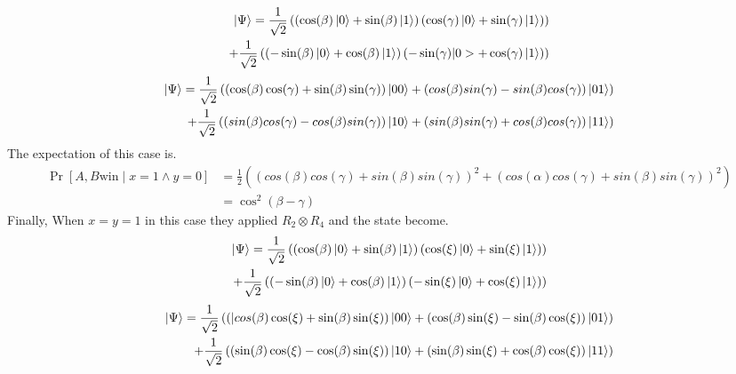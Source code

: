 \begin{equation*}
\begin{aligned}
\ket{\Psi }= \frac{1}{\sqrt{2}}\left( \left(\cos(\beta)\ket{0}+\sin(\beta)\ket{1} \right) \left(\cos(\gamma)\ket{0}+\sin(\gamma)\ket{1} \right) \right)  \\  
+  \frac{1}{\sqrt{2}} \left( \left(-\sin(\beta)\ket{0}+\cos(\beta)\ket{1} \right) \left(-\sin(\gamma)|0>+\cos(\gamma)\ket{1} \right) \right)
\end{aligned}
\end{equation*}
\begin{equation*}
\begin{aligned}
\ket{\Psi }= \frac{1}{\sqrt{2}}\left(\left(\cos(\beta) \cos(\gamma)+\sin(\beta) \sin(\gamma)\right)\ket{00}+\left( cos(\beta)  sin(\gamma)-sin(\beta)  cos(\gamma)\right)\ket{01}\right)\\
+\frac{1}{\sqrt{2}}\left( \left( sin(\beta)  cos(\gamma)-cos(\beta) sin(\gamma)\right)\ket{10}+\left(sin(\beta) sin(\gamma)+cos(\beta)  cos(\gamma)\right)\ket{11}\right)
\end{aligned}
\end{equation*}
The expectation of this case is.
\begin{align} 
\Pr[A,B \text{win} \mid x=1 \wedge y=0]&=\frac{1}{2}\left(\left(cos(\beta) cos(\gamma)+sin(\beta)sin(\gamma)\right)^2 +\left(cos(\alpha) cos(\gamma)+sin(\beta)sin(\gamma)\right)^2  \right)\nonumber\\ 
&=\cos^2(\beta-\gamma)\label{eq4}
\end{align}
Finally, When $x=y=1$ in this case they applied $R_2\otimes R_4$ and the state become.
\begin{equation*}
\begin{aligned}
\ket{\Psi }= \frac{1}{\sqrt{2}}\left( \left(\cos(\beta)\ket{0}+\sin(\beta)\ket{1} \right) \left(\cos(\xi)\ket{0}+\sin(\xi)\ket{1} \right) \right)  \\  
+\frac{1}{\sqrt{2}} \left( \left(-\sin(\beta)\ket{0}+\cos(\beta)\ket{1} \right) \left(-\sin(\xi)\ket{0}+\cos(\xi)\ket{1} \right) \right)
\end{aligned}
\end{equation*}
\begin{equation*}
\begin{aligned}
\ket{\Psi}= \frac{1}{\sqrt{2}}\left(\left(|cos(\beta) \cos(\xi)+\sin(\beta) \sin(\xi)\right)\ket{00}+\left( \cos(\beta)  \sin(\xi)-\sin(\beta)  \cos(\xi)\right)\ket{01}\right)\\
+\frac{1}{\sqrt{2}}\left( \left( \sin(\beta)  \cos(\xi)-\cos(\beta) \sin(\xi)\right)\ket{10}+\left(\sin(\beta) \sin(\xi)+\cos(\beta)  \cos(\xi)\right)\ket{11}\right)
\end{aligned}
\end{equation*}
